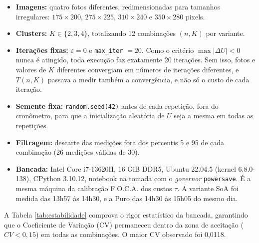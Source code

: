\documentclass[11pt,a4paper]{article}
\begin{document}
\begin{itemize}
    \item \textbf{Imagens:} quatro fotos diferentes, redimensionadas para tamanhos irregulares: $175 \times 200$, $275 \times 225$, $310 \times 240$ e $350 \times 280$ pixels.
    \item \textbf{Clusters:} $K \in \{2, 3, 4\}$, totalizando 12 combinações $(n, K)$ por variante.
    \item \textbf{Iterações fixas:} $\varepsilon = 0$ e \texttt{max\_iter} $= 20$. Como o critério $\max|\Delta U| < 0$ nunca é atingido, toda execução faz exatamente 20 iterações. Sem isso, fotos e valores de $K$ diferentes convergiam em números de iterações diferentes, e $T(n, K)$ passava a medir também a convergência, e não só o custo de cada iteração.
    \item \textbf{Semente fixa:} \texttt{random.seed(42)} antes de cada repetição, fora do cronômetro, para que a inicialização aleatória de $U$ seja a mesma em todas as repetições.
    \item \textbf{Filtragem:} descarte das medições fora dos percentis 5 e 95 de cada combinação (26 medições válidas de 30).
    \item \textbf{Bancada:} Intel Core i7-13620H, 16 GiB DDR5, Ubuntu 22.04.5 (kernel 6.8.0-138), CPython 3.10.12, notebook na tomada com o \textit{governor} \texttt{powersave}. É a mesma máquina da calibração F.O.C.A. dos custos $\tau$. A variante SoA foi medida das 13h57 às 14h30, e a Puro das 14h30 às 15h05 do mesmo dia.
\end{itemize}

A Tabela \ref{tab:estabilidade} comprova o rigor estatístico da bancada, garantindo que o Coeficiente de Variação (CV) permaneceu dentro da zona de aceitação ($CV < 0{,}15$) em todas as combinações. O maior CV observado foi 0,0118.
\end{document}
